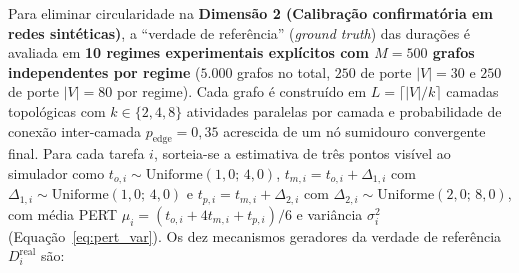 \documentclass[12pt,openany,oneside,a4paper,english,brazilian,sumario=tradicional]{abntex2}
\begin{document}
Para eliminar circularidade na \textbf{Dimensão 2 (Calibração confirmatória em redes sintéticas)}, a ``verdade de referência'' (\textit{ground truth}) das durações é avaliada em \textbf{10 regimes experimentais explícitos com $M=500$ grafos independentes por regime} ($5.000$ grafos no total, $250$ de porte $|V|=30$ e $250$ de porte $|V|=80$ por regime). Cada grafo é construído em $L = \lceil |V|/k \rceil$ camadas topológicas com $k \in \{2, 4, 8\}$ atividades paralelas por camada e probabilidade de conexão inter-camada $p_{\text{edge}}=0{,}35$ acrescida de um nó sumidouro convergente final. Para cada tarefa $i$, sorteia-se a estimativa de três pontos visível ao simulador como $t_{o,i} \sim \mathrm{Uniforme}(1{,}0;\,4{,}0)$, $t_{m,i} = t_{o,i} + \Delta_{1,i}$ com $\Delta_{1,i} \sim \mathrm{Uniforme}(1{,}0;\,4{,}0)$ e $t_{p,i} = t_{m,i} + \Delta_{2,i}$ com $\Delta_{2,i} \sim \mathrm{Uniforme}(2{,}0;\,8{,}0)$, com média PERT $\mu_i = (t_{o,i}+4t_{m,i}+t_{p,i})/6$ e variância $\sigma_i^2$ (Equação~\ref{eq:pert_var}). Os dez mecanismos geradores da verdade de referência $D_i^{\mathrm{real}}$ são:
\end{document}
